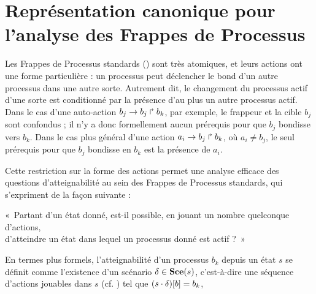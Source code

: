 
\chapter{Représentation canonique pour l'analyse des Frappes de Processus}




Les Frappes de Processus standards () sont très atomiques,
et leurs actions ont une forme particulière :
un processus peut déclencher le bond d'un autre processus dans une autre sorte.
Autrement dit, le changement du processus actif d'une sorte est conditionné par la présence
d'au plus un autre processus actif.
Dans le cas d'une auto-action $b_j\rightarrow b_j\Rsh b_k$, par exemple,
le frappeur et la cible $b_j$ sont confondus ;
il n'y a donc formellement aucun prérequis pour que $b_j$ bondisse vers $b_k$.
Dans le cas plus général d'une action $a_i\rightarrow b_j\Rsh b_k$, où $a_i \neq b_j$,
le seul prérequis pour que $b_j$ bondisse en $b_k$ est la présence de $a_i$.

Cette restriction sur la forme des actions permet une analyse efficace des questions d'atteignabilité
au sein des Frappes de Processus standards, qui s'expriment de la façon suivante :
\begin{center}
  «~Partant d'un état donné, est-il possible, en jouant un nombre quelconque d'actions,\\
  d'atteindre un état dans lequel un processus donné est actif ?~»
\end{center}
En termes plus formels, l'atteignabilité d'un processus $b_k$ depuis un état $s$
se définit comme l'existence d'un scénario $\delta \in \mathbf{Sce}(s)$,
c'est-à-dire une séquence d'actions jouables dans $s$ (cf. )
tel que ${(s \cdot \delta)[b]} = b_k$,



